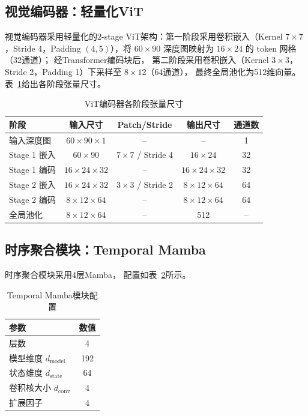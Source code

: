 \subsection{视觉编码器：轻量化ViT}

视觉编码器采用轻量化的2-stage ViT架构：第一阶段采用卷积嵌入（Kernel $7 \times 7$，Stride 4，Padding $(4, 5)$），将 $60 \times 90$ 深度图映射为 $16 \times 24$ 的 token 网格（32通道）；
经Transformer编码块后，
第二阶段采用卷积嵌入（Kernel $3 \times 3$，Stride 2，Padding 1）下采样至 $8 \times 12$（64通道），
最终全局池化为512维向量。
表~\ref{tab:vit_tensor_ch3}给出各阶段张量尺寸。

\begin{table}[htbp]
\centering
\caption{ViT编码器各阶段张量尺寸}
\label{tab:vit_tensor_ch3}
\begin{tabular}{lcccc}
\toprule
\textbf{阶段} & \textbf{输入尺寸} & \textbf{Patch/Stride} & \textbf{输出尺寸} & \textbf{通道数} \\
\midrule
输入深度图 & $60 \times 90 \times 1$ & -- & -- & 1 \\
Stage 1 嵌入 & $60 \times 90$ & $7{\times}7$ / Stride 4 & $16 \times 24$ & 32 \\
Stage 1 编码 & $16 \times 24 \times 32$ & -- & $16 \times 24 \times 32$ & 32 \\
Stage 2 嵌入 & $16 \times 24 \times 32$ & $3{\times}3$ / Stride 2 & $8 \times 12 \times 64$ & 64 \\
Stage 2 编码 & $8 \times 12 \times 64$ & -- & $8 \times 12 \times 64$ & 64 \\
全局池化 & $8 \times 12 \times 64$ & -- & 512 & -- \\
\bottomrule
\end{tabular}
\end{table}

\subsection{时序聚合模块：Temporal Mamba}

时序聚合模块采用4层Mamba\cite{Gu2023Mamba}，
配置如表~\ref{tab:mamba_config_ch3}所示。

\begin{table}[htbp]
\centering
\caption{Temporal Mamba模块配置}
\label{tab:mamba_config_ch3}
\begin{tabular}{lc}
\toprule
\textbf{参数} & \textbf{数值} \\
\midrule
层数 & 4 \\
模型维度 $d_{\text{model}}$ & 192 \\
状态维度 $d_{\text{state}}$ & 64 \\
卷积核大小 $d_{\text{conv}}$ & 4 \\
扩展因子 & 4 \\
\bottomrule
\end{tabular}
\end{table}

